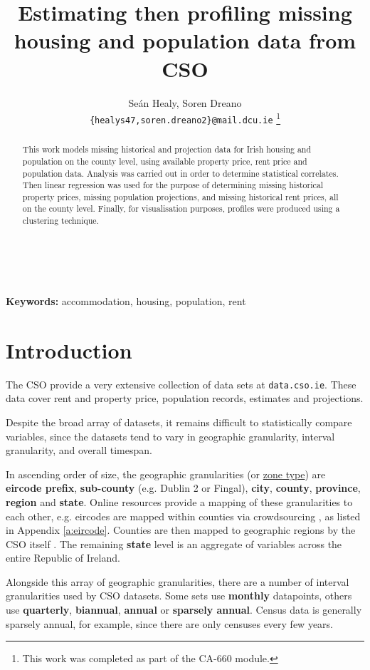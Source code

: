 \documentclass[twocolumn]{article}
\title{Estimating then profiling missing housing and population data from CSO}
\author{
    Seán Healy, Soren Dreano\\
    \texttt{\{healys47,soren.dreano2\}@mail.dcu.ie}
    \footnote{This work was completed as part of the CA-660 module.}
}
\begin{document}
\maketitle
\begin{abstract}
This work models missing historical and projection data for Irish
housing and population on the county level, using available
property price, rent price and population data.  Analysis was
carried out in order to determine statistical correlates.  Then linear
regression was used for the purpose of determining missing historical property
prices, missing population projections, and missing historical rent prices,
all on the county level.  Finally, for visualisation purposes, profiles
were produced using a clustering technique.
\end{abstract}\\\\
{\bf Keywords:} accommodation, housing, population, rent

\section{Introduction\label{s:intro}}
The CSO provide a very extensive collection of data sets at
{\tt data.cso.ie}.  These data cover rent and property price, population
records, estimates and projections.

Despite the broad array of datasets, it remains difficult to statistically
compare variables, since the datasets tend to vary in geographic granularity,
interval granularity, and overall timespan.

In ascending order of size, the geographic granularities (or \underline{zone type}) are {\bf eircode prefix},
{\bf sub-county} (e.g. Dublin 2 or Fingal), {\bf city}, {\bf county}, {\bf province}, {\bf region} and {\bf state}.  Online resources provide a mapping of
these granularities to each other, e.g. eircodes are mapped within counties via crowdsourcing
\cite{eircode19}, as listed in Appendix \ref{a:eircode}.  Counties are then mapped to geographic
regions by the CSO itself \cite{cso_regions}.  The remaining {\bf state} level is an aggregate of variables
across the entire Republic of Ireland.

Alongside this array of geographic granularities, there are a number of interval granularities used by CSO
datasets.  Some sets use {\bf monthly} datapoints, others use {\bf quarterly}, {\bf biannual}, {\bf annual}
or {\bf sparsely annual}.  Census data is generally sparsely annual, for example, since there are only
censuses every few years.
\end{document}
